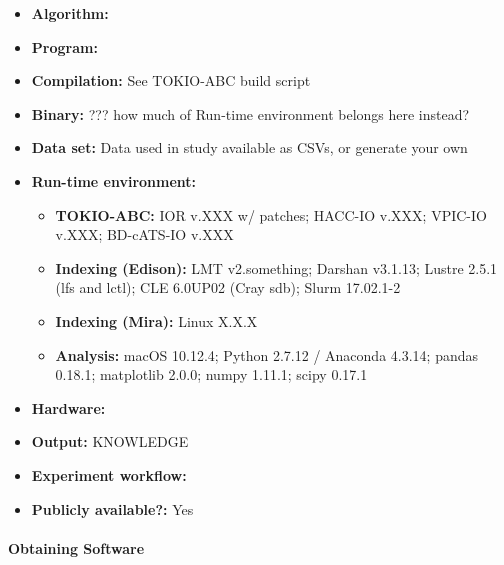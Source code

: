 \begin{itemize}
	\item \textbf{Algorithm:}
    \item \textbf{Program:}
    \item \textbf{Compilation:} See TOKIO-ABC build script
    \item \textbf{Binary:} ??? how much of Run-time environment belongs here instead?
    \item \textbf{Data set:} Data used in study available as CSVs, or generate your own
    \item \textbf{Run-time environment:} 
    \begin{itemize}
    	\item \textbf{TOKIO-ABC:} IOR v.XXX w/ patches; HACC-IO v.XXX; VPIC-IO v.XXX; BD-cATS-IO v.XXX
    	\item \textbf{Indexing (Edison):} LMT v2.something; Darshan v3.1.13; Lustre 2.5.1 (lfs and lctl); CLE 6.0UP02 (Cray sdb);  Slurm 17.02.1-2
    	\item \textbf{Indexing (Mira):} Linux X.X.X
    	\item \textbf{Analysis:} macOS 10.12.4; Python 2.7.12 / Anaconda 4.3.14; pandas 0.18.1; matplotlib 2.0.0; numpy 1.11.1; scipy 0.17.1
	\end{itemize}
    \item \textbf{Hardware:}
    \item \textbf{Output:} KNOWLEDGE
    \item \textbf{Experiment workflow:}
    \item \textbf{Publicly available?:} Yes
\end{itemize}

\paragraph{Obtaining Software}

